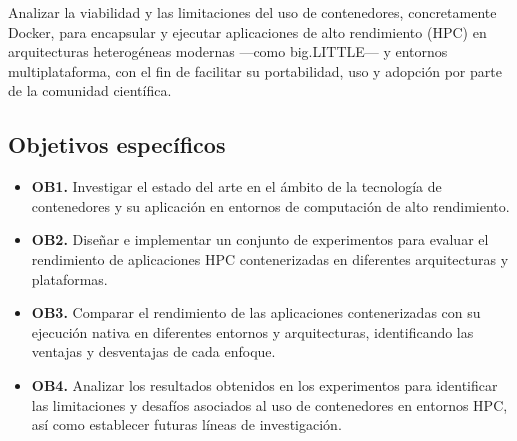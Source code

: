 Analizar la viabilidad y las limitaciones del uso de contenedores, concretamente Docker, para encapsular y ejecutar aplicaciones de alto rendimiento (HPC) en arquitecturas heterogéneas modernas —como big.LITTLE— y entornos multiplataforma, con el fin de facilitar su portabilidad, uso y adopción por parte de la comunidad científica.

\subsection{Objetivos específicos}\label{subsec:objetivos_especificos}

\begin{itemize}
   \item \textbf{OB1.} Investigar el estado del arte en el ámbito de la tecnología de contenedores y su aplicación en entornos de computación de alto rendimiento.
   \item \textbf{OB2.} Diseñar e implementar un conjunto de experimentos para evaluar el rendimiento de aplicaciones HPC contenerizadas en diferentes arquitecturas y plataformas.
   \item \textbf{OB3.} Comparar el rendimiento de las aplicaciones contenerizadas con su ejecución nativa en diferentes entornos y arquitecturas, identificando las ventajas y desventajas de cada enfoque.
   \item \textbf{OB4.} Analizar los resultados obtenidos en los experimentos para identificar las limitaciones y desafíos asociados al uso de contenedores en entornos HPC, así como establecer futuras líneas de investigación.
\end{itemize}

